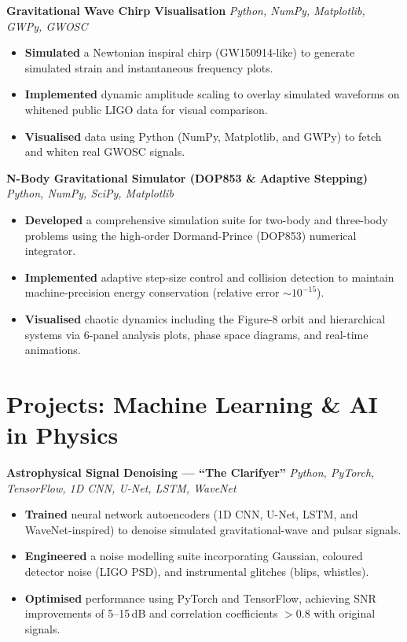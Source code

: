 \documentclass[10pt, a4paper]{article}
\newenvironment{project}[2]{%
  \textbf{\color{accent}#1} \hfill
  \small\textit{\color{light}#2}%
  \begin{itemize}%
}{%
  \end{itemize}%
  \vspace{2pt}%
}
\begin{document}
\begin{project}{Gravitational Wave Chirp Visualisation}{Python, NumPy, Matplotlib, GWPy, GWOSC}
  \item \textbf{Simulated} a Newtonian inspiral chirp (GW150914-like) to generate simulated strain and instantaneous frequency plots.
  \item \textbf{Implemented} dynamic amplitude scaling to overlay simulated waveforms on whitened public LIGO data for visual comparison.
  \item \textbf{Visualised} data using Python (NumPy, Matplotlib, and GWPy) to fetch and whiten real GWOSC signals.
\end{project}

\begin{project}{N-Body Gravitational Simulator (DOP853 \& Adaptive Stepping)}{Python, NumPy, SciPy, Matplotlib}
  \item \textbf{Developed} a comprehensive simulation suite for two-body and three-body problems using the high-order Dormand-Prince (DOP853) numerical integrator.
  \item \textbf{Implemented} adaptive step-size control and collision detection to maintain machine-precision energy conservation (relative error $\sim 10^{-15}$).
  \item \textbf{Visualised} chaotic dynamics including the Figure-8 orbit and hierarchical systems via 6-panel analysis plots, phase space diagrams, and real-time animations.
\end{project}

\section{Projects: Machine Learning \& AI in Physics}

\begin{project}{Astrophysical Signal Denoising --- ``The Clarifyer''}{Python, PyTorch, TensorFlow, 1D CNN, U-Net, LSTM, WaveNet}
  \item \textbf{Trained} neural network autoencoders (1D CNN, U-Net, LSTM, and WaveNet-inspired) to denoise simulated gravitational-wave and pulsar signals.
  \item \textbf{Engineered} a noise modelling suite incorporating Gaussian, coloured detector noise (LIGO PSD), and instrumental glitches (blips, whistles).
  \item \textbf{Optimised} performance using PyTorch and TensorFlow, achieving SNR improvements of 5--15\,dB and correlation coefficients $>0.8$ with original signals.
\end{project}
\end{document}
